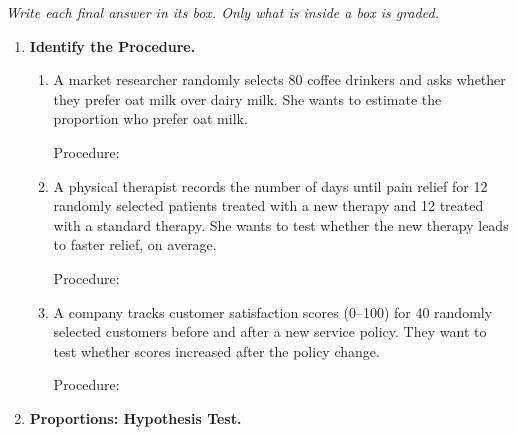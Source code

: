 \documentclass[10pt]{article}
\begin{document}
{\small\itshape Write each final answer in its box. Only what is inside a box is graded.}\par

\vspace{0.12in}

\begin{enumerate}

\item \textbf{Identify the Procedure.}

\begin{enumerate}[label=\alph*.]
  \item A market researcher randomly selects 80 coffee drinkers and asks whether they prefer
        oat milk over dairy milk. She wants to estimate the proportion who prefer oat milk.

        Procedure: \smash{\gradedblank[id=hw1a, type=short, points=1, answer={{one-sample z-interval for p}}, check=text, display={\boldmath one-sample $z$-interval for $p$}]{8.8cm}{0.19in}}

  \item A physical therapist records the number of days until pain relief for 12 randomly
        selected patients treated with a new therapy and 12 treated with a standard therapy.
        She wants to test whether the new therapy leads to faster relief, on average.

        Procedure: \smash{\gradedblank[id=hw1b, type=short, points=1, answer={{two-sample t-test for mu1 - mu2}}, check=text, display={\boldmath two-sample $t$-test for $\mu_1 - \mu_2$}]{8.8cm}{0.19in}}

  \item A company tracks customer satisfaction scores (0--100) for 40 randomly selected
        customers before and after a new service policy. They want to test whether scores
        increased after the policy change.

        Procedure: \smash{\gradedblank[id=hw1c, type=short, points=1, answer={{matched-pairs t-test for mu_d}}, check=text, display={\boldmath matched-pairs $t$-test for $\mu_d$}]{8.8cm}{0.19in}}
\end{enumerate}

\vspace{0.10in}

\item \textbf{Proportions: Hypothesis Test.}


\end{enumerate}
\end{document}
